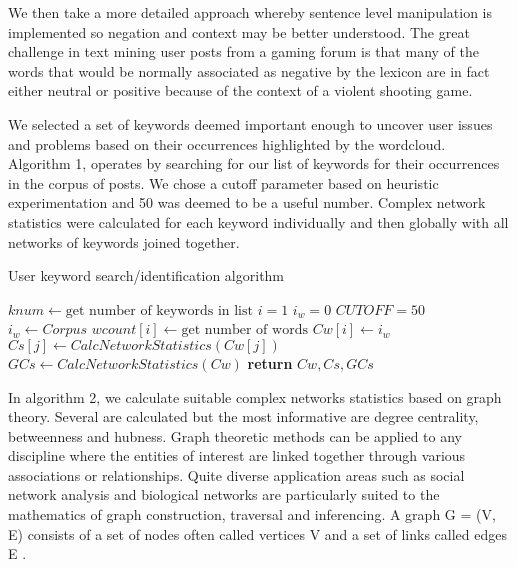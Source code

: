 \documentclass{svproc}
\begin{document}
We then take a more detailed approach whereby sentence level manipulation is implemented so negation and context may be better understood. The great challenge in text mining user posts from a gaming forum is that many of the words that would be normally associated as negative by the lexicon are in fact either neutral or positive because of the context of a violent shooting game.


We selected a set of keywords deemed important enough to uncover user issues and problems based on their occurrences highlighted by the wordcloud. Algorithm 1, operates by  searching for our list of keywords for their occurrences in the corpus of posts. We chose a cutoff parameter based on heuristic experimentation and 50 was deemed to be a useful number. Complex network statistics were calculated for each keyword individually and then globally with all networks of keywords joined together.

\begin{algorithm}
\caption{User keyword search/identification algorithm}\label{alg1}
\begin{algorithmic}[1]
   \State $knum \gets \mbox {get number of keywords in list}$
   \State$i = 1$
   \State$i_w =0$
   \State$CUTOFF =50$
      \\
           \State \textit{$i_w \gets Corpus$}
           \State \texttt{$wcount[i] \gets \mbox{get number of words}$}
            \State \texttt{$Cw[i] \gets i_w$}
            \EndIf
                   \State \textit{$Cs[j] \gets CalcNetworkStatistics(Cw[j])$  }
                \EndFor
      \EndFor  
    \State \textit{$GCs \gets CalcNetworkStatistics(Cw)$  }  
   \State \textbf{return} $Cw, Cs, GCs$
\EndProcedure
\end{algorithmic}
\end{algorithm}

In algorithm 2, we calculate suitable complex networks statistics based on graph theory. Several are calculated but the most informative are degree centrality, betweenness and hubness. Graph theoretic methods can be applied to any discipline where the entities of interest are linked together through various associations or relationships.  Quite diverse application areas such as social network analysis and biological networks are particularly suited to the mathematics of graph construction, traversal and inferencing. A graph G = (V, E) consists of a set of nodes often called vertices V and a set of links called edges E \cite{Freeman1979,Barabasi2004,Barabasi2011}.
\end{document}
